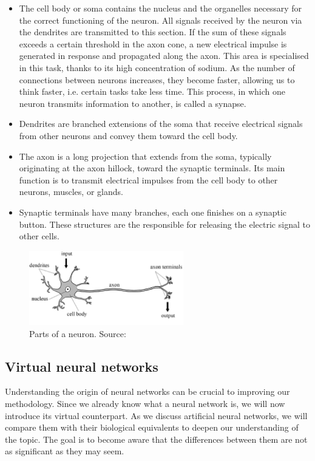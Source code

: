 \begin{itemize}
    \item The cell body or soma contains the nucleus and the organelles necessary for the correct functioning of the neuron. All signals received by the neuron via the dendrites are transmitted to this section. If the sum of these signals exceeds a certain threshold in the axon cone, a new electrical impulse is generated in response and propagated along the axon. This area is specialised in this task, thanks to its high concentration of sodium. As the number of connections between neurons increases, they become faster, allowing us to think faster, i.e. certain tasks take less time. This process, in which one neuron transmits information to another, is called a synapse.
    \item Dendrites are branched extensions of the soma that receive electrical signals from other neurons and convey them toward the cell body.
    \item The axon is a long projection that extends from the soma, typically originating at the axon hillock, toward the synaptic terminals. Its main function is to transmit electrical impulses from the cell body to other neurons, muscles, or glands.
    \item Synaptic terminals have many branches, each one finishes on a synaptic button. These structures are the responsible for releasing the electric signal to other cells.
\end{itemize}

\begin{figure}[h!]
    \centering
    \includegraphics[width=0.6\textwidth]{figures/neural_parts.png}
    \caption{Parts of a neuron. Source: \cite{partsNeuron}}
    \label{fig:neuron}
\end{figure}

\subsection{Virtual neural networks}

Understanding the origin of neural networks can be crucial to improving our methodology. Since we already know what a neural network is, we will now introduce its virtual counterpart. As we discuss artificial neural networks, we will compare them with their biological equivalents to deepen our understanding of the topic. The goal is to become aware that the differences between them are not as significant as they may seem.

